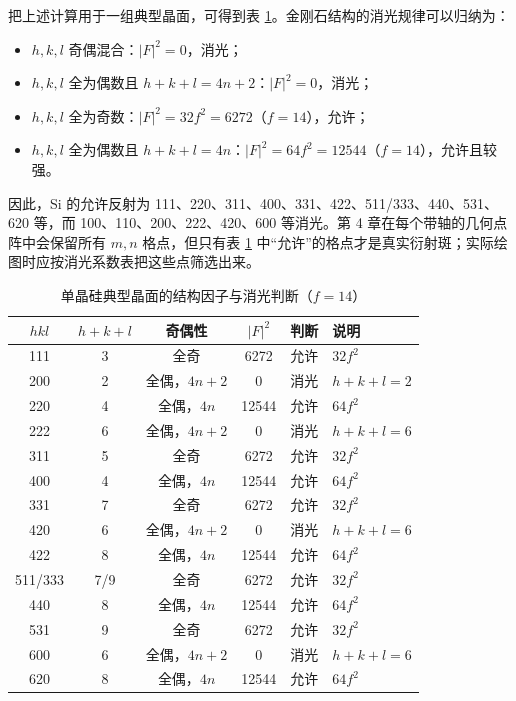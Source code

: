 把上述计算用于一组典型晶面，可得到表 \ref{tab:extinction-examples}。金刚石结构的消光规律可以归纳为：
\begin{itemize}[leftmargin=2em,itemsep=1pt]
  \item $h,k,l$ 奇偶混合：$|F|^2=0$，消光；
  \item $h,k,l$ 全为偶数且 $h+k+l=4n+2$：$|F|^2=0$，消光；
  \item $h,k,l$ 全为奇数：$|F|^2=32f^2=6272$（$f=14$），允许；
  \item $h,k,l$ 全为偶数且 $h+k+l=4n$：$|F|^2=64f^2=12544$（$f=14$），允许且较强。
\end{itemize}
因此，Si 的允许反射为 111、220、311、400、331、422、511/333、440、531、620 等，而 100、110、200、222、420、600 等消光。第 4 章在每个带轴的几何点阵中会保留所有 $m,n$ 格点，但只有表 \ref{tab:extinction-examples} 中“允许”的格点才是真实衍射斑；实际绘图时应按消光系数表把这些点筛选出来。

\begin{table}[H]
  \centering
  \caption{单晶硅典型晶面的结构因子与消光判断（$f=14$）}
  \label{tab:extinction-examples}
  \small
  \setlength{\tabcolsep}{5pt}
  \renewcommand{\arraystretch}{1.03}
  \begin{tabular}{cccccl}
    \toprule
    $hkl$ & $h+k+l$ & 奇偶性 & $|F|^2$ & 判断 & 说明 \\
    \midrule
    111 & 3 & 全奇 & 6272  & 允许 & $32f^2$ \\
    200 & 2 & 全偶，$4n+2$ & 0 & 消光 & $h+k+l=2$ \\
    220 & 4 & 全偶，$4n$ & 12544 & 允许 & $64f^2$ \\
    222 & 6 & 全偶，$4n+2$ & 0 & 消光 & $h+k+l=6$ \\
    311 & 5 & 全奇 & 6272  & 允许 & $32f^2$ \\
    400 & 4 & 全偶，$4n$ & 12544 & 允许 & $64f^2$ \\
    331 & 7 & 全奇 & 6272  & 允许 & $32f^2$ \\
    420 & 6 & 全偶，$4n+2$ & 0 & 消光 & $h+k+l=6$ \\
    422 & 8 & 全偶，$4n$ & 12544 & 允许 & $64f^2$ \\
    511/333 & 7/9 & 全奇 & 6272 & 允许 & $32f^2$ \\
    440 & 8 & 全偶，$4n$ & 12544 & 允许 & $64f^2$ \\
    531 & 9 & 全奇 & 6272 & 允许 & $32f^2$ \\
    600 & 6 & 全偶，$4n+2$ & 0 & 消光 & $h+k+l=6$ \\
    620 & 8 & 全偶，$4n$ & 12544 & 允许 & $64f^2$ \\
    \bottomrule
  \end{tabular}
\end{table}
